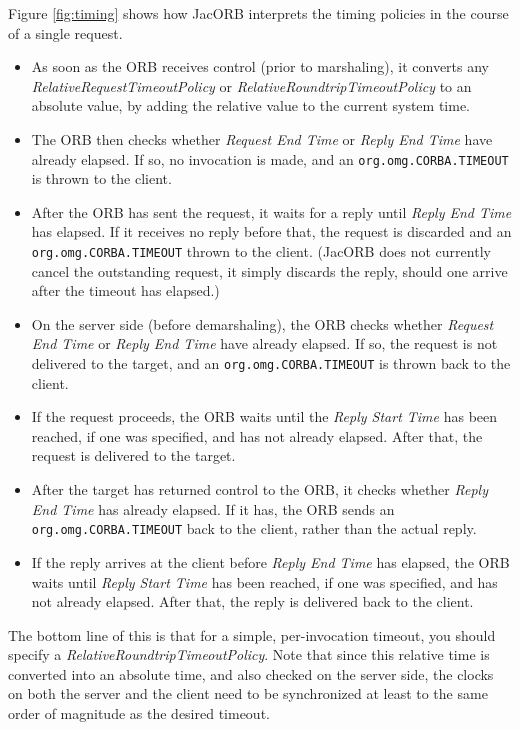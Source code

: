 Figure \ref{fig:timing} shows how JacORB interprets the timing
policies in the course of a single request.

\begin{itemize}
\item As soon as the ORB receives control (prior to marshaling), it
converts any \emph{RelativeRequestTimeoutPolicy} or
\emph{RelativeRoundtripTimeoutPolicy} to an absolute value, by adding
the relative value to the current system time.

\item The ORB then checks whether \emph{Request End Time} or
\emph{Reply End Time} have already elapsed.  If so, no invocation is
made, and an {\tt org.omg.CORBA.TIMEOUT} is thrown to the client.

\item After the ORB has sent the request, it waits for a reply until
\emph{Reply End Time} has elapsed.  If it receives no reply before
that, the request is discarded and an {\tt org.omg.CORBA.TIMEOUT}
thrown to the client.  (JacORB does not currently cancel the
outstanding request, it simply discards the reply, should one arrive
after the timeout has elapsed.)

\item On the server side (before demarshaling), the ORB checks
whether \emph{Request End Time} or \emph{Reply End Time} have already
elapsed.  If so, the request is not delivered to the target, and an
{\tt org.omg.CORBA.TIMEOUT} is thrown back to the client.

\item If the request proceeds, the ORB waits until the \emph{Reply
Start Time} has been reached, if one was specified, and has not
already elapsed.  After that, the request is delivered to the target.

\item After the target has returned control to the ORB, it checks
whether \emph{Reply End Time} has already elapsed.  If it has, the ORB
sends an {\tt org.omg.CORBA.TIMEOUT} back to the client, rather than
the actual reply.

\item If the reply arrives at the client before \emph{Reply End Time}
has elapsed, the ORB waits until \emph{Reply Start Time} has been
reached, if one was specified, and has not already elapsed.  After
that, the reply is delivered back to the client.

\end{itemize}

The bottom line of this is that for a simple, per-invocation timeout,
you should specify a \mbox{\emph{RelativeRoundtripTimeoutPolicy}}.  Note
that since this relative time is converted into an absolute time, and
also checked on the server side, the clocks on both the server and
the client need to be synchronized at least to the same order of
magnitude as the desired timeout.

